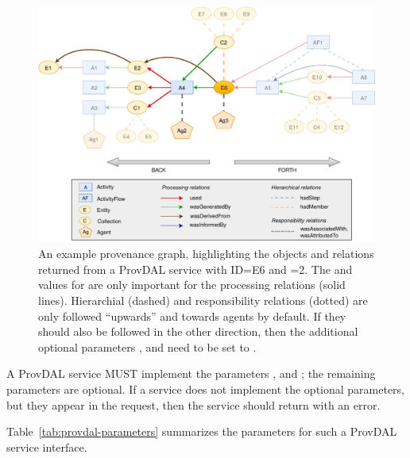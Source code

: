 \begin{figure}[h]
\centering
\includegraphics[width=1.0\textwidth]{provenance-graph-example-depth2.pdf}
\caption{An example provenance graph, highlighting the objects and relations returned from a ProvDAL service with ID=E6 and =2. The  and  values for  are only important for the processing relations (solid lines). Hierarchial (dashed) and responsibility relations (dotted) are only followed ``upwards'' and towards agents by default. If they should also be followed in the other direction, then the additional optional parameters ,  and  need to be set to .}
\label{fig:provenance-graph-example}
\end{figure}


A ProvDAL service MUST implement the parameters ,  and ; the remaining parameters are optional.
If a service does not implement the optional parameters, but they appear in the request, then the service should return with an error.

Table~\ref{tab:provdal-parameters} summarizes the parameters for such a ProvDAL service interface.

